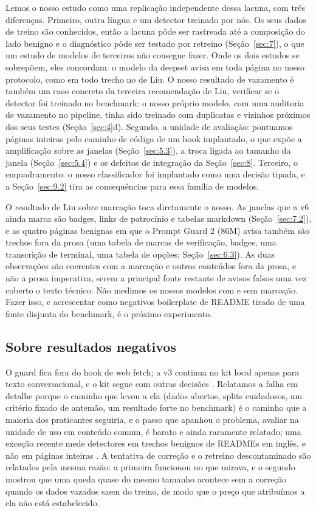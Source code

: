 \documentclass[11pt]{article}
\begin{document}
Lemos o nosso estudo como uma replicação independente dessa lacuna, com três diferenças. Primeiro, outra língua e um detector treinado por nós. Os seus dados de treino são conhecidos, então a lacuna pôde ser rastreada até a composição do lado benigno e o diagnóstico pôde ser testado por retreino (Seção~\ref{sec:7}), o que um estudo de modelos de terceiros não consegue fazer. Onde os dois estudos se sobrepõem, eles concordam: o modelo da deepset avisa em toda página no nosso protocolo, como em todo trecho no de Liu. O nosso resultado de vazamento é também um caso concreto da terceira recomendação de Liu, verificar se o detector foi treinado no benchmark: o nosso próprio modelo, com uma auditoria de vazamento no pipeline, tinha sido treinado com duplicatas e vizinhos próximos dos seus testes (Seção~\ref{sec:4}d). Segundo, a unidade de avaliação: pontuamos páginas inteiras pelo caminho de código de um hook implantado, o que expõe a amplificação sobre as janelas (Seção~\ref{sec:5.3}), a troca ligada ao tamanho da janela (Seção~\ref{sec:5.4}) e os defeitos de integração da Seção~\ref{sec:8}. Terceiro, o enquadramento: o nosso classificador foi implantado como uma decisão tipada, e a Seção~\ref{sec:9.2} tira as consequências para essa família de modelos.

O resultado de Liu sobre marcação toca diretamente o nosso. As janelas que a v6 ainda marca são badges, links de patrocínio e tabelas markdown (Seção~\ref{sec:7.2}), e as quatro páginas benignas em que o Prompt Guard 2 (86M) avisa também são trechos fora da prosa (uma tabela de marcas de verificação, badges, uma transcrição de terminal, uma tabela de opções; Seção~\ref{sec:6.3}). As duas observações são coerentes com a marcação e outros conteúdos fora da prosa, e não a prosa imperativa, serem a principal fonte restante de avisos falsos uma vez coberto o texto técnico. Não medimos os nossos modelos com e sem marcação. Fazer isso, e acrescentar como negativos boilerplate de README tirado de uma fonte disjunta do benchmark, é o próximo experimento.

\subsection{Sobre resultados negativos}\label{sec:9.4}

O guard fica fora do hook de web fetch; a v3 continua no kit local apenas para texto conversacional, e o kit segue com outras decisões%
. Relatamos a falha em detalhe porque o caminho que levou a ela (dados abertos, splits cuidadosos, um critério fixado de antemão, um resultado forte no benchmark) é o caminho que a maioria dos praticantes seguiria, e o passo que apanhou o problema, avaliar na unidade de uso em conteúdo comum, é barato e ainda raramente relatado; uma exceção recente mede detectores em trechos benignos de READMEs em inglês, e não em páginas inteiras \citep{liu2026passing}. A tentativa de correção e o retreino descontaminado são relatados pela mesma razão: a primeira funcionou no que mirava, e o segundo mostrou que uma queda quase do mesmo tamanho acontece sem a correção quando os dados vazados saem do treino, de modo que o preço que atribuímos a ela não está estabelecido.
\end{document}
